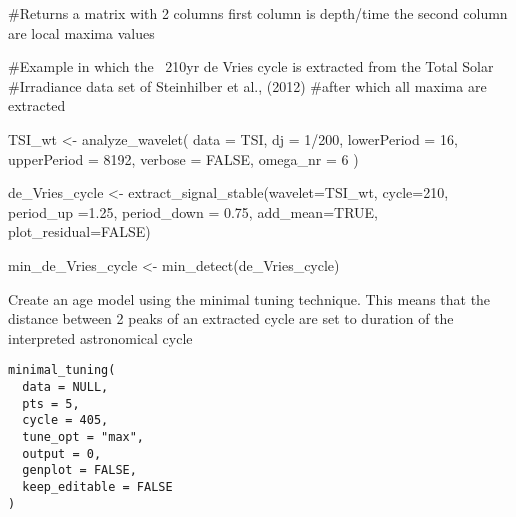 \documentclass[a4paper]{book}
\begin{document}
%
\begin{Value}
\#Returns a matrix with 2 columns
first column is depth/time
the second column are local maxima values
\end{Value}
%
\begin{Examples}
\begin{ExampleCode}
#Example in which the ~210yr de Vries cycle is extracted from the Total Solar
#Irradiance data set of Steinhilber et al., (2012)
#after which all maxima are extracted

TSI_wt <-
analyze_wavelet(
data = TSI,
dj = 1/200,
lowerPeriod = 16,
upperPeriod = 8192,
   verbose = FALSE,
   omega_nr = 6
 )

de_Vries_cycle <- extract_signal_stable(wavelet=TSI_wt,
cycle=210,
period_up =1.25,
period_down = 0.75,
add_mean=TRUE,
plot_residual=FALSE)


min_de_Vries_cycle <- min_detect(de_Vries_cycle)

\end{ExampleCode}
\end{Examples}
%
\begin{Description}
Create an age model using the minimal tuning technique.
This means that the distance between 2 peaks of an extracted cycle are set
to duration of the interpreted astronomical cycle
\end{Description}
%
\begin{Usage}
\begin{verbatim}
minimal_tuning(
  data = NULL,
  pts = 5,
  cycle = 405,
  tune_opt = "max",
  output = 0,
  genplot = FALSE,
  keep_editable = FALSE
)
\end{verbatim}
\end{Usage}
%
\end{document}
